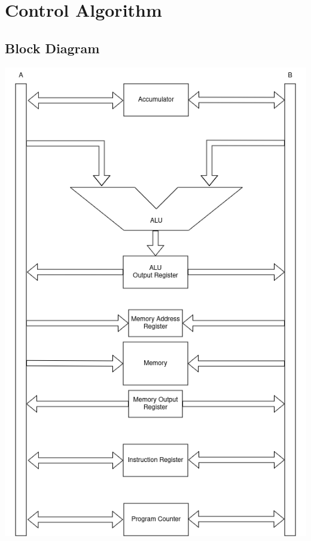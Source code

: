 \section{Control Algorithm}\label{sec:abstract-description}
\subsection{Block Diagram}\label{subsec:block-diagram}
\begin{center}
    \includegraphics[scale=0.58]{img/Andromeda-Block Diagram.drawio}
\end{center}
